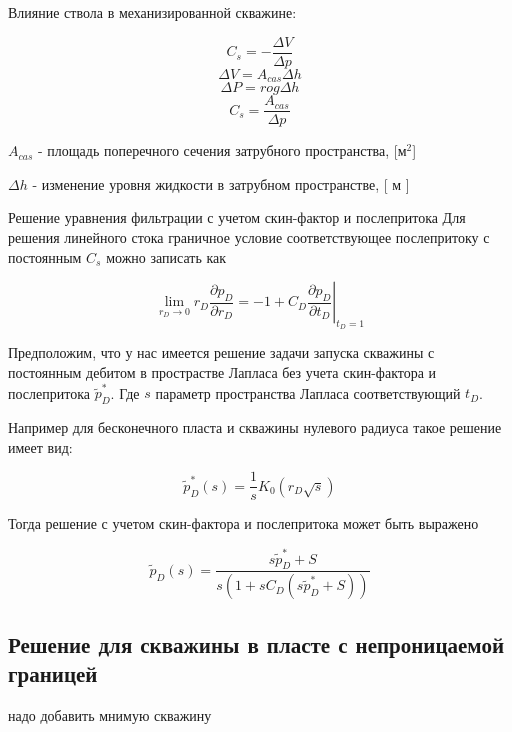Влияние ствола в механизированной скважине:

$$ C_s = - \frac{ \Delta V}{ \Delta p} $$
$$ {\Delta V} = A_{cas}{\Delta h} $$
$$ {\Delta P} ={ro g}{\Delta h}$$
$$ C_s =  \frac{ A_{cas}}{ \Delta p} $$

$ A_{cas}$ - площадь поперечного сечения затрубного пространства, [м$^2$]


$ {\Delta h}$ - изменение уровня жидкости в затрубном пространстве, [ м ]

Решение уравнения фильтрации с учетом скин-фактор и послепритока
Для решения линейного стока граничное условие соответствующее послепритоку с постоянным $C_s$ можно записать как

$$ \lim_{r_D \to 0} {r_D \frac{\partial p_D}{\partial r_D}} = -1 + \left. C_D \frac{\partial p_D}{\partial t_D} \right|_{t_D=1}$$

Предположим, что у нас имеется решение задачи запуска скважины с постоянным дебитом в прострастве Лапласа без учета скин-фактора и послепритока $\tilde{p}_D^{*}$. Где $s$ параметр пространства Лапласа соответствующий $t_D$.

Например для бесконечного пласта и скважины нулевого радиуса такое решение имеет вид: 

$$\tilde{p}_D^*(s) = \frac{1}{s} K_0 \left( r_D \sqrt s  \right) $$

Тогда решение с учетом скин-фактора и послепритока может быть выражено 

$$\tilde{p}_D(s) = \frac{s \tilde{p}_D^* + S}{s \left( 1+s C_D \left( s \tilde{p}_D^* + S \right)  \right)}   $$



%
%
%
%




\subsection{Решение для скважины в пласте с непроницаемой границей}
надо добавить мнимую скважину

